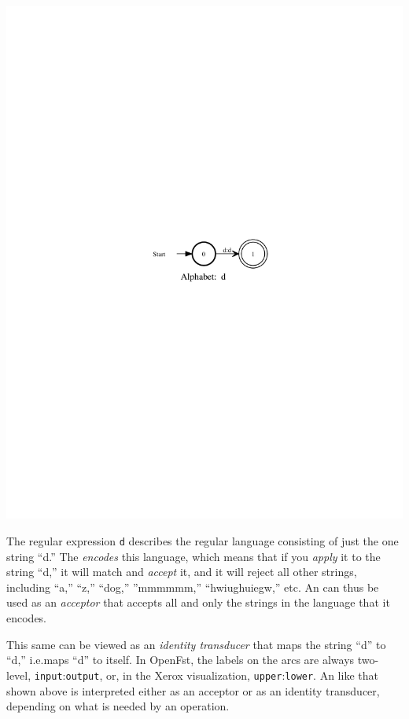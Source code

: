 \begin{center}
\includegraphics{images/d.pdf}
\end{center}

\noindent
The regular expression \texttt{d} describes the regular language consisting of just the
one string ``d.''  The \fsm{} \emph{encodes} this language, which means that if you
\emph{apply} it to the string ``d,'' it will match and \emph{accept} it, and it will reject all other
strings, including ``a,'' ``z,'' ``dog,'' ''mmmmmm,'' ``hwiughuiegw,'' etc.  An \fsm{}
can thus be used as an \emph{acceptor} that accepts all and only the strings in the
language that it encodes.

This same \fsm{} can be viewed as an \emph{identity transducer} that maps the string
``d'' to ``d,'' i.e.\@ maps ``d'' to itself.  In OpenFst, the labels on the arcs are always
two-level, \texttt{input}:\texttt{output}, or, in the Xerox visualization,
\texttt{upper}:\texttt{lower}.  An \fsm{} like that shown above is interpreted either as an acceptor
or as an identity transducer, depending on what is needed by an operation.

